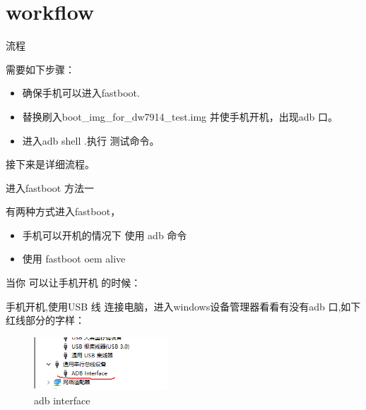 \section{workflow}


\begin{frame}[fragile]{流程}

需要如下步骤：
\begin{itemize}
\item 确保手机可以进入fastboot.
\item 替换刷入boot\_img\_for\_dw7914\_test.img 并使手机开机，出现adb 口。
\item 进入adb shell .执行 测试命令。
\end{itemize}

接下来是详细流程。

\end{frame}


\begin{frame}[fragile]{进入fastboot 方法一}

 有两种方式进入fastboot，
\begin{itemize}
  \item 手机可以开机的情况下 使用 adb 命令
  \item   使用 fastboot oem alive
\end{itemize}


 当你 可以让手机开机 的时候：

手机开机,使用USB 线 连接电脑，进入windows设备管理器看看有没有adb 口,如下红线部分的字样：
\begin{figure}[htbp]
\begin{center}
\includegraphics[width=5cm]{img/adb}
\caption{adb interface }
\label{adb interface}
\end{center}
\vspace{-0.5em}
\end{figure}

\end{frame}


